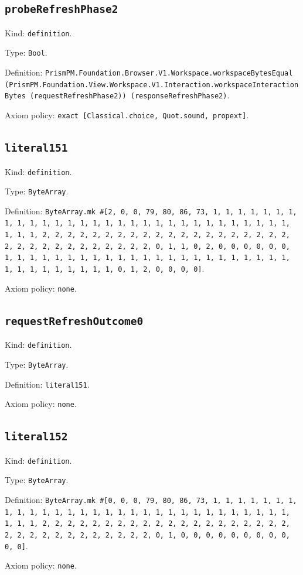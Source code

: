 \documentclass[11pt]{article}
\begin{document}
\subsection*{\texttt{probeRefreshPhase2}}
\noindent Kind: \texttt{definition}.\par
\noindent Type: \texttt{Bool}.\par
\noindent Definition: \texttt{PrismPM.Foundation.Browser.V1.Workspace.workspaceBytesEqual (PrismPM.Foundation.View.Workspace.V1.Interaction.workspaceInteractionBytes (requestRefreshPhase2)) (responseRefreshPhase2)}.\par
\noindent Axiom policy: \texttt{exact [Classical.choice, Quot.sound, propext]}.\par
\subsection*{\texttt{literal151}}
\noindent Kind: \texttt{definition}.\par
\noindent Type: \texttt{ByteArray}.\par
\noindent Definition: \texttt{ByteArray.mk \#[2, 0, 0, 79, 80, 86, 73, 1, 1, 1, 1, 1, 1, 1, 1, 1, 1, 1, 1, 1, 1, 1, 1, 1, 1, 1, 1, 1, 1, 1, 1, 1, 1, 1, 1, 1, 1, 1, 1, 1, 2, 2, 2, 2, 2, 2, 2, 2, 2, 2, 2, 2, 2, 2, 2, 2, 2, 2, 2, 2, 2, 2, 2, 2, 2, 2, 2, 2, 2, 2, 2, 2, 0, 1, 1, 0, 2, 0, 0, 0, 0, 0, 0, 1, 1, 1, 1, 1, 1, 1, 1, 1, 1, 1, 1, 1, 1, 1, 1, 1, 1, 1, 1, 1, 1, 1, 1, 1, 1, 1, 1, 1, 1, 1, 1, 0, 1, 2, 0, 0, 0, 0]}.\par
\noindent Axiom policy: \texttt{none}.\par
\subsection*{\texttt{requestRefreshOutcome0}}
\noindent Kind: \texttt{definition}.\par
\noindent Type: \texttt{ByteArray}.\par
\noindent Definition: \texttt{literal151}.\par
\noindent Axiom policy: \texttt{none}.\par
\subsection*{\texttt{literal152}}
\noindent Kind: \texttt{definition}.\par
\noindent Type: \texttt{ByteArray}.\par
\noindent Definition: \texttt{ByteArray.mk \#[0, 0, 0, 79, 80, 86, 73, 1, 1, 1, 1, 1, 1, 1, 1, 1, 1, 1, 1, 1, 1, 1, 1, 1, 1, 1, 1, 1, 1, 1, 1, 1, 1, 1, 1, 1, 1, 1, 1, 1, 2, 2, 2, 2, 2, 2, 2, 2, 2, 2, 2, 2, 2, 2, 2, 2, 2, 2, 2, 2, 2, 2, 2, 2, 2, 2, 2, 2, 2, 2, 2, 2, 0, 1, 0, 0, 0, 0, 0, 0, 0, 0, 0, 0, 0]}.\par
\noindent Axiom policy: \texttt{none}.\par
\end{document}
